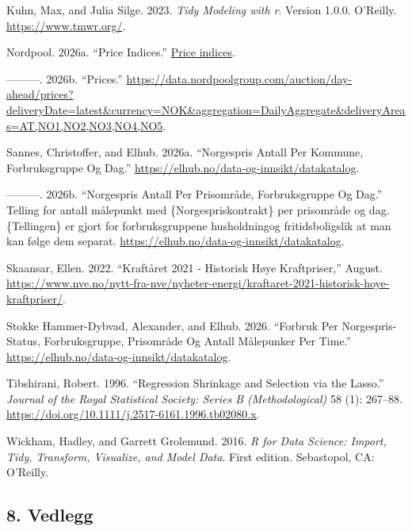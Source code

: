 \documentclass[
  letterpaper,
  DIV=11,
  numbers=noendperiod]{scrartcl}
\newlength{\cslhangindent}
\newenvironment{CSLReferences}[2] %
 {\begin{list}{}{%
  \setlength{\itemindent}{0pt}
  \setlength{\leftmargin}{0pt}
  \setlength{\parsep}{0pt}
  \ifodd #1
   \setlength{\leftmargin}{\cslhangindent}
   \setlength{\itemindent}{-1\cslhangindent}
  \fi
  \setlength{\itemsep}{#2\baselineskip}}}
 {\end{list}}
\begin{document}
\begin{CSLReferences}{1}{0}
Kuhn, Max, and Julia Silge. 2023. \emph{Tidy Modeling with r}. Version
1.0.0. O'Reilly. \url{https://www.tmwr.org/}.

Nordpool. 2026a. {``Price Indices.''}
\href{https://Price\%20indices}{Price indices}.

---------. 2026b. {``Prices.''}
\url{https://data.nordpoolgroup.com/auction/day-ahead/prices?deliveryDate=latest&currency=NOK&aggregation=DailyAggregate&deliveryAreas=AT,NO1,NO2,NO3,NO4,NO5}.

Sannes, Christoffer, and Elhub. 2026a. {``Norgespris Antall Per Kommune,
Forbruksgruppe Og Dag.''}
\url{https://elhub.no/data-og-innsikt/datakatalog}.

---------. 2026b. {``Norgespris Antall Per Prisområde, Forbruksgruppe Og
Dag.''} Telling for antall målepunkt med \{Norgespriskontrakt\} per
prisområde og dag. \{Tellingen\} er gjort for forbruksgruppene
husholdningog fritidsboligslik at man kan følge dem separat.
\url{https://elhub.no/data-og-innsikt/datakatalog}.

Skaansar, Ellen. 2022. {``Kraftåret 2021 - Historisk Høye
Kraftpriser,''} August.
\url{https://www.nve.no/nytt-fra-nve/nyheter-energi/kraftaret-2021-historisk-hoye-kraftpriser/}.

Stokke Hammer-Dybvad, Alexander, and Elhub. 2026. {``Forbruk Per
{Norgespris}-Status, Forbruksgruppe, Prisområde Og Antall Målepunker Per
Time.''} \url{https://elhub.no/data-og-innsikt/datakatalog}.

Tibshirani, Robert. 1996. {``Regression Shrinkage and Selection via the
Lasso.''} \emph{Journal of the Royal Statistical Society: Series B
(Methodological)} 58 (1): 267--88.
\url{https://doi.org/10.1111/j.2517-6161.1996.tb02080.x}.

Wickham, Hadley, and Garrett Grolemund. 2016. \emph{R for Data Science:
Import, Tidy, Transform, Visualize, and Model Data}. First edition.
Sebastopol, CA: O'Reilly.

\end{CSLReferences}

\subsection{8. Vedlegg}\label{vedlegg}
\end{document}
